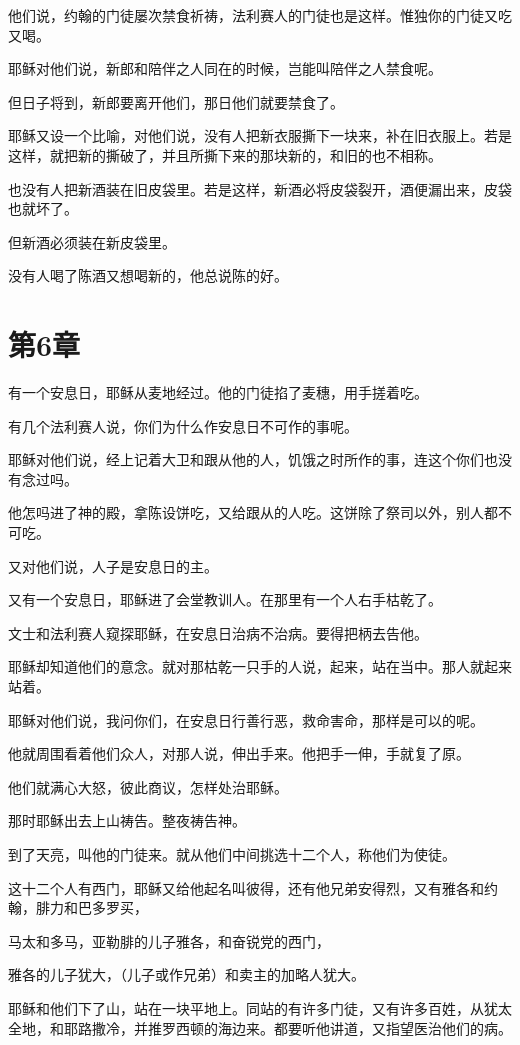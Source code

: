 \documentclass[12pt,oneside]{book}
\begin{document}
他们说，约翰的门徒屡次禁食祈祷，法利赛人的门徒也是这样。惟独你的门徒又吃又喝。

耶稣对他们说，新郎和陪伴之人同在的时候，岂能叫陪伴之人禁食呢。

但日子将到，新郎要离开他们，那日他们就要禁食了。

耶稣又设一个比喻，对他们说，没有人把新衣服撕下一块来，补在旧衣服上。若是这样，就把新的撕破了，并且所撕下来的那块新的，和旧的也不相称。

也没有人把新酒装在旧皮袋里。若是这样，新酒必将皮袋裂开，酒便漏出来，皮袋也就坏了。

但新酒必须装在新皮袋里。

没有人喝了陈酒又想喝新的，他总说陈的好。

\chapter{第6章}
有一个安息日，耶稣从麦地经过。他的门徒掐了麦穗，用手搓着吃。

有几个法利赛人说，你们为什么作安息日不可作的事呢。

耶稣对他们说，经上记着大卫和跟从他的人，饥饿之时所作的事，连这个你们也没有念过吗。

他怎吗进了神的殿，拿陈设饼吃，又给跟从的人吃。这饼除了祭司以外，别人都不可吃。

又对他们说，人子是安息日的主。

又有一个安息日，耶稣进了会堂教训人。在那里有一个人右手枯乾了。

文士和法利赛人窥探耶稣，在安息日治病不治病。要得把柄去告他。

耶稣却知道他们的意念。就对那枯乾一只手的人说，起来，站在当中。那人就起来站着。

耶稣对他们说，我问你们，在安息日行善行恶，救命害命，那样是可以的呢。

他就周围看着他们众人，对那人说，伸出手来。他把手一伸，手就复了原。

他们就满心大怒，彼此商议，怎样处治耶稣。

那时耶稣出去上山祷告。整夜祷告神。

到了天亮，叫他的门徒来。就从他们中间挑选十二个人，称他们为使徒。

这十二个人有西门，耶稣又给他起名叫彼得，还有他兄弟安得烈，又有雅各和约翰，腓力和巴多罗买，

马太和多马，亚勒腓的儿子雅各，和奋锐党的西门，

雅各的儿子犹大，（儿子或作兄弟）和卖主的加略人犹大。

耶稣和他们下了山，站在一块平地上。同站的有许多门徒，又有许多百姓，从犹太全地，和耶路撒冷，并推罗西顿的海边来。都要听他讲道，又指望医治他们的病。
\end{document}
